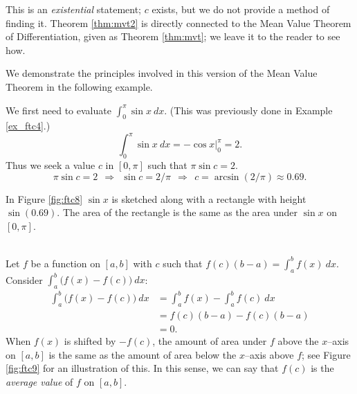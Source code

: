 This is an \emph{existential} statement; $c$ exists, but we do not provide a method of finding it. Theorem \ref{thm:mvt2} is directly connected to the Mean Value Theorem of Differentiation, given %
as Theorem \ref{thm:mvt}; we leave it to the reader to see how.

We demonstrate the principles involved in this version of the Mean Value Theorem in the following example.\\

{We first need to evaluate $\int_0^\pi \sin x\ dx$. (This was previously done in Example \ref{ex_ftc4}.)
		$$\int_0^\pi\sin x\ dx =	-\cos x \Big|_0^\pi = 2.$$
Thus we seek a value $c$ in $[0,\pi]$ such that $\pi\sin c =2$. 
$$\pi\sin c = 2\ \ \Rightarrow\ \ \sin c = 2/\pi\ \ \Rightarrow\ \ c = \arcsin(2/\pi) \approx 0.69.$$

In Figure \ref{fig:ftc8} $\sin x$ is sketched along with a rectangle with height $\sin (0.69)$. The area of the rectangle is the same as the area under $\sin x$ on $[0,\pi]$.
}\\

Let $f$ be a function on $[a,b]$ with $c$ such that $f(c)(b-a) = \int_a^bf(x)\ dx$. Consider $\int_a^b\big(f(x)-f(c)\big)\ dx$:
\begin{align*}
	\int_a^b\big(f(x)-f(c)\big)\ dx &=	\int_a^b f(x) - \int_a^b f(c)\ dx\\
							&= f(c)(b-a) - f(c)(b-a) \\
							&= 0.
\end{align*}
When $f(x)$ is shifted by $-f(c)$, the amount of area under $f$ above the $x$--axis on $[a,b]$ is the same as the amount of area below the $x$--axis above $f$; see Figure \ref{fig:ftc9} for an illustration of this. In this sense, we can say that $f(c)$ is the \textit{average value} of $f$ on $[a,b]$. 

{%
{\hfill {}}
} %
{%
{\\ \noindent {}}
}%

